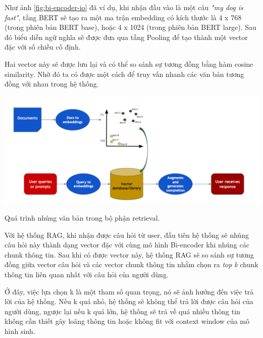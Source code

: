 \documentclass[a4paper, 12pt, openany]{book}
\begin{document}
\vspace{0.5cm}

Như ảnh \ref{fig:bi-encoder-io} đã ví dụ, khi nhận đầu vào là một câu \textit{"my dog is fast"}, tầng BERT sẽ tạo ra một ma trận embedding có kích thước là 4 x 768 (trong phiên bản BERT base), hoặc 4 x 1024 (trong phiên bản BERT large). Sau đó biểu diễn ngữ nghĩa sẽ được đưa qua tầng Pooling để tạo thành một vector đặc với số chiều cố định.

Hai vector này sẽ được lưu lại và có thể so sánh sự tương đồng bằng hàm cosine similarity. Nhờ đó ta có được một cách để truy vấn nhanh
các văn bản tương đồng với nhau trong hệ thống.

\vspace{0.5cm}

\begin{minipage}{\linewidth}
    \centering
    \includegraphics[width=\linewidth]{./assets/images/rag-embedding.png}
    \captionsetup{type=figure}
    \caption{Quá trình nhúng văn bản trong bộ phận retrieval.}
\end{minipage}

\vspace{0.5cm}

Với hệ thống RAG, khi nhận được câu hỏi từ user, đầu tiên hệ thống sẽ nhúng câu hỏi này thành dạng vector đặc
với cùng mô hình Bi-encoder khi nhúng các chunk thông tin. Sau khi có được vector này, hệ thống RAG sẽ so sánh sự tương đồng giữa vector câu hỏi và các vector chunk thông tin nhằm chọn 
ra \textit{top k} chunk thông tin liên quan nhất với câu hỏi của người dùng.

Ở đây, việc lựa chọn k là một tham số quan trọng, nó sẽ ảnh hưởng đến việc trả lời của hệ thống. 
Nếu k quá nhỏ, hệ thống sẽ không thể trả lời được câu hỏi của người dùng, ngược lại nếu k quá lớn, hệ thống sẽ trả về quá nhiều thông tin không cần thiết gây loãng thông tin hoặc không fit với context window của mô hình sinh.
\end{document}
